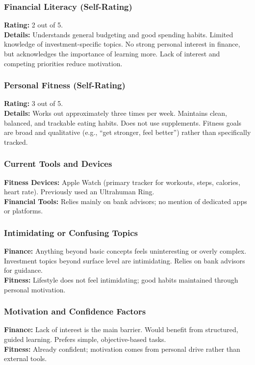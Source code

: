 \documentclass[12pt]{article}
\begin{document}
\subsubsection*{Financial Literacy (Self-Rating)}
\textbf{Rating:} 2 out of 5. \\
\textbf{Details:} Understands general budgeting and good spending habits. Limited knowledge of investment-specific topics. No strong personal interest in finance, but acknowledges the importance of learning more. Lack of interest and competing priorities reduce motivation.

\subsubsection*{Personal Fitness (Self-Rating)}
\textbf{Rating:} 3 out of 5. \\
\textbf{Details:} Works out approximately three times per week. Maintains clean, balanced, and trackable eating habits. Does not use supplements. Fitness goals are broad and qualitative (e.g., “get stronger, feel better”) rather than specifically tracked.

\subsubsection*{Current Tools and Devices}
\textbf{Fitness Devices:} Apple Watch (primary tracker for workouts, steps, calories, heart rate). Previously used an Ultrahuman Ring. \\
\textbf{Financial Tools:} Relies mainly on bank advisors; no mention of dedicated apps or platforms.

\subsubsection*{Intimidating or Confusing Topics}
\textbf{Finance:} Anything beyond basic concepts feels uninteresting or overly complex. Investment topics beyond surface level are intimidating. Relies on bank advisors for guidance. \\
\textbf{Fitness:} Lifestyle does not feel intimidating; good habits maintained through personal motivation.

\subsubsection*{Motivation and Confidence Factors}
\textbf{Finance:} Lack of interest is the main barrier. Would benefit from structured, guided learning. Prefers simple, objective-based tasks. \\
\textbf{Fitness:} Already confident; motivation comes from personal drive rather than external tools.
\end{document}
